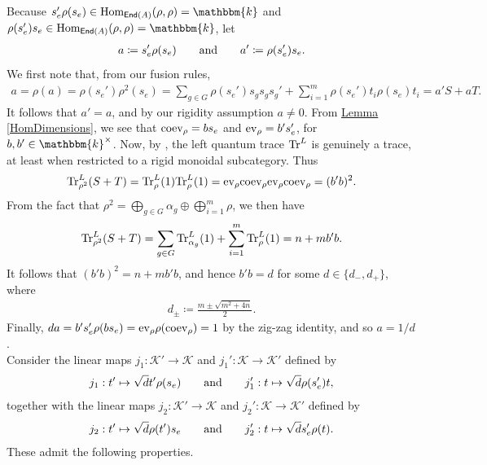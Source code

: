 \noindent Because $s_e'\rho(s_e) \in \homset_{\textcat{End}(A)}(\rho, \rho) = \mathbbm{k}$ and $\rho(s_e')s_e \in \homset_{\textcat{End}(A)}(\rho, \rho) = \mathbbm{k}$, let
\begin{align*}
a \coloneqq s_e'\rho(s_e)\qquad\textup{and}\qquad a' \coloneqq \rho(s_e')s_e.
\end{align*}
\noindent We first note that, from our fusion rules,
\begin{align*}
a = \rho(a) = \rho(s_e')\rho^2(s_e) = \sum_{g \in G} \rho(s_e') s_g s_g s_g' + \sum_{i=1}^m \rho(s_e') t_i\rho(s_e)t_i = a'S + a T.
\end{align*}
\noindent It follows that $a' = a$, and by our rigidity assumption $a \neq 0$. From \hyperref[HomDimensions]{Lemma \ref*{HomDimensions}}, we see that $\textup{coev}_\rho = b s_e$ and $\textup{ev}_\rho = b' s_e'$, for $b, b' \in \mathbbm{k}^\times$. %
Now, by \cite[Proposition 4.7.3]{EGNO16}, the left quantum trace $\textup{Tr}^L$ is genuinely a trace, at least when restricted to a rigid monoidal subcategory. Thus
\begin{align*}
\textup{Tr}^L_{\rho^2}(S + T) = \textup{Tr}^L_\rho(1)\textup{Tr}^L_\rho(1) = \textup{ev}_{\rho}\textup{coev}_{\rho}\textup{ev}_{\rho}\textup{coev}_{\rho} = (b'b)^2.
\end{align*}
\noindent From the fact that $\rho^2 = \bigoplus_{g \in G} \alpha_g \oplus \bigoplus_{i=1}^m \rho$, we then have
\begin{align*}
\textup{Tr}^L_{\rho^2}(S + T) = \sum_{g \in G}\textup{Tr}^L_{\alpha_g}(1) + \sum_{i=1}^m \textup{Tr}^L_\rho(1) = n + m b'b.
\end{align*}
\noindent It follows that $(b'b)^2 = n + m b'b$, and hence $b'b = {d}$ for some $d \in \{d_-, d_+\}$, where
\begin{align*}
d_\pm \coloneqq \frac{m \pm \sqrt{m^2 + 4n}}{2}.
\end{align*}
\noindent Finally, ${d} a = b's_e'\rho(b s_e) = \textup{ev}_\rho\rho(\textup{coev}_\rho) = 1$ by the zig-zag identity, and so $a = 1/{d}$.\\

\noindent Consider the linear maps $j_1 : \mathcal{K}' \to \mathcal{K}$ and $j_1' : \mathcal{K} \to \mathcal{K}'$ defined by
\begin{align*}
j_1 : t' \mapsto \sqrt{d}t'\rho(s_e)\qquad\textup{and}\qquad j_1' : t \mapsto \sqrt{d}\rho(s_e')t,
\end{align*}
\noindent together with the linear maps $j_2 : \mathcal{K}' \to \mathcal{K}$ and $j_2' : \mathcal{K} \to \mathcal{K}'$ defined by
\begin{align*}
j_2 : t' \mapsto \sqrt{d}\rho(t')s_e\qquad\textup{and}\qquad j_2' : t \mapsto \sqrt{d}s_e'\rho(t).
\end{align*}
\noindent These admit the following properties.\\

